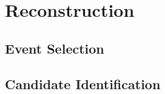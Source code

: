 \section{\deltaray Reconstruction}
\label{sec:reco}
\subsection{\eetomm Event Selection}
\subsection{\deltaray Candidate Identification}

